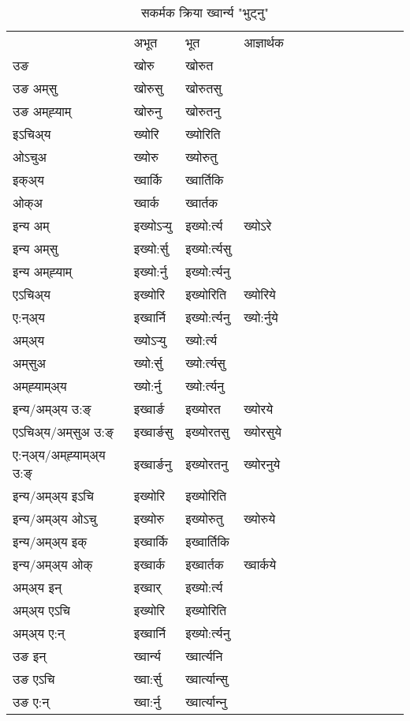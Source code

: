 \begin{table}[H]
\centering
\caption{\label{or.vt} सकर्मक क्रिया  ख्‍वार्न्य  "भुट्नु"  }
\begin{tabular}{l|l|l|l|l|l|l|l|l|l|l|l|l}  \toprule
&अभूत & भूत & आज्ञार्थक \\ 
उङ &खोरु &खोरुत \\ 
उङ अम्‌सु &खोरुसु &खोरुतसु \\ 
उङ अम्‌ह्‍याम् &खोरुनु &खोरुतनु \\ 
इऽचिअ्य &ख्योरि &ख्योरिति   \\ 
ओऽचुअ &ख्योरु &ख्योरुतु   \\ 
इक्अ्य &ख्‍वार्कि &ख्‍वार्तिकि   \\ 
ओक्अ &ख्‍वार्क &ख्‍वार्तक   \\ 
इन्य अम् & इख्योऽर्‍यु  & इख्यो:र्त्य &ख्योऽरे  \\ 
इन्य अम्‌सु & इख्यो:र्सु  & इख्यो:र्त्यसु   \\ 
इन्य अम्‌ह्‍याम् & इख्यो:र्नु  & इख्यो:र्त्यनु   \\ 
एऽचिअ्य & इख्योरि & इख्योरिति &ख्योरिये    \\ 
ए:न्अ्य & इख्‍वार्नि  & इख्यो:र्त्यनु &ख्यो:र्नुये  \\ 
अम्अ्य & ख्योऽर्‍यु  & ख्यो:र्त्य  \\ 
अम्‌सुअ & ख्यो:र्सु & ख्यो:र्त्यसु  \\ 
अम्‌ह्‍याम्अ्य & ख्यो:र्नु  & ख्यो:र्त्यनु \\ 
\midrule
इन्य/अम्अ्य उ:ङ्‌&इख्‍वार्ङ & इख्योरत &ख्योरये \\ 
एऽचिअ्य/अम्‌सुअ उ:ङ्‌ &इख्‍वार्ङसु & इख्योरतसु &ख्योरसुये \\ 
ए:न्अ्य/अम्‌ह्‍याम्अ्य उ:ङ्‌ &इख्‍वार्ङनु & इख्योरतनु &ख्योरनुये \\ 
इन्य/अम्अ्य इऽचि & इख्योरि & इख्योरिति    \\ 
इन्य/अम्अ्य ओऽचु & इख्योरु & इख्योरुतु  &ख्योरुये  \\ 
इन्य/अम्अ्य इक् & इख्‍वार्कि & इख्‍वार्तिकि   \\ 
इन्य/अम्अ्य ओक् & इख्‍वार्क & इख्‍वार्तक  &ख्‍वार्कये  \\ 
अम्अ्य इन् & इख्‍वार् & इख्यो:र्त्य   \\ 
अम्अ्य एऽचि & इख्योरि & इख्योरिति    \\ 
अम्अ्य ए:न् & इख्‍वार्नि  & इख्यो:र्त्यनु  \\ 
\midrule
उङ इन् & ख्‍वार्न्य  & ख्‍वार्त्यनि  \\ 
उङ एऽचि & ख्‍वा:र्सु  & ख्‍वार्त्यान्सु   \\ 
उङ ए:न्& ख्‍वा:र्नु  & ख्‍वार्त्यान्‍नु   \\ 
\bottomrule
\end{tabular}
\end{table}



